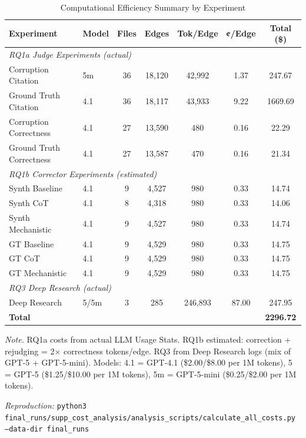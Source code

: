 \begin{table}[H]
\centering
\caption{Computational Efficiency Summary by Experiment}
\label{tab:scaling_summary}
\footnotesize
\begin{tabular}{llccccc}
\toprule
\textbf{Experiment} & \textbf{Model} & \textbf{Files} & \textbf{Edges} & \textbf{Tok/Edge} & \textbf{¢/Edge} & \textbf{Total (\$)} \\
\midrule
\multicolumn{7}{l}{\textit{RQ1a Judge Experiments (actual)}} \\
Corruption Citation & 5m & 36 & 18,120 & 42,992 & 1.37 & 247.67 \\
Ground Truth Citation & 4.1 & 36 & 18,117 & 43,933 & 9.22 & 1669.69 \\
Corruption Correctness & 4.1 & 27 & 13,590 & 480 & 0.16 & 22.29 \\
Ground Truth Correctness & 4.1 & 27 & 13,587 & 470 & 0.16 & 21.34 \\
\midrule
\multicolumn{7}{l}{\textit{RQ1b Corrector Experiments (estimated)}} \\
Synth Baseline & 4.1 & 9 & 4,527 & 980 & 0.33 & 14.74 \\
Synth CoT & 4.1 & 8 & 4,318 & 980 & 0.33 & 14.06 \\
Synth Mechanistic & 4.1 & 9 & 4,527 & 980 & 0.33 & 14.74 \\
GT Baseline & 4.1 & 9 & 4,529 & 980 & 0.33 & 14.75 \\
GT CoT & 4.1 & 9 & 4,529 & 980 & 0.33 & 14.75 \\
GT Mechanistic & 4.1 & 9 & 4,529 & 980 & 0.33 & 14.75 \\
\midrule
\multicolumn{7}{l}{\textit{RQ3 Deep Research (actual)}} \\
Deep Research & 5/5m & 3 & 285 & 246,893 & 87.00 & 247.95 \\
\midrule
\textbf{Total} & & & & & & \textbf{2296.72} \\
\bottomrule
\end{tabular}
\begin{tablenotes}
\small
\item \textit{Note.} RQ1a costs from actual LLM Usage Stats. RQ1b estimated: correction + rejudging = 2$\times$ correctness tokens/edge. RQ3 from Deep Research logs (mix of GPT-5 + GPT-5-mini). Models: 4.1 = GPT-4.1 (\$2.00/\$8.00 per 1M tokens), 5 = GPT-5 (\$1.25/\$10.00 per 1M tokens), 5m = GPT-5-mini (\$0.25/\$2.00 per 1M tokens).
\item \textit{Reproduction:} \texttt{python3 final\_runs/supp\_cost\_analysis/analysis\_scripts/calculate\_all\_costs.py --data-dir final\_runs}
\end{tablenotes}
\end{table}